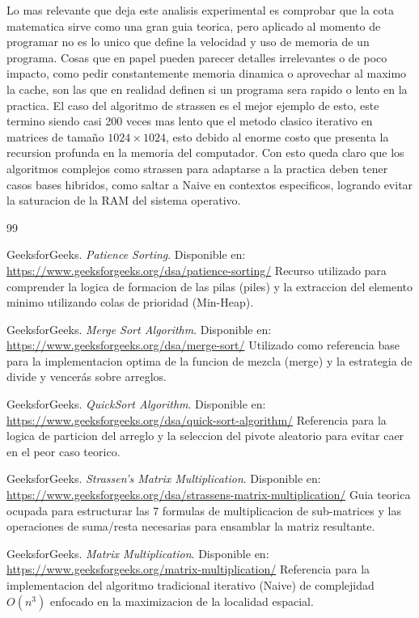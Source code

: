 Lo mas relevante que deja este analisis experimental es comprobar que la cota matematica sirve como una gran guia teorica, pero aplicado al momento de programar no es lo unico que define la velocidad y uso de memoria de un programa. Cosas que en papel pueden parecer detalles irrelevantes o de poco impacto, como pedir constantemente memoria dinamica o aprovechar al maximo la cache, son las que en realidad definen si un programa sera rapido o lento en la practica. El caso del algoritmo de strassen es el mejor ejemplo de esto, este termino siendo casi 200 veces mas lento que el metodo clasico iterativo en matrices de tamaño $1024 \times 1024$, esto debido al enorme costo que presenta la recursion profunda en la memoria del computador. Con esto queda claro que los algoritmos complejos como strassen para adaptarse a la practica deben tener casos bases hibridos, como saltar a Naive en contextos especificos, logrando evitar la saturacion de la RAM del sistema operativo.

\vspace{1cm}

\begin{thebibliography}{99}

GeeksforGeeks. \textit{Patience Sorting}. Disponible en: \url{https://www.geeksforgeeks.org/dsa/patience-sorting/}
Recurso utilizado para comprender la logica de formacion de las pilas (piles) y la extraccion del elemento minimo utilizando colas de prioridad (Min-Heap).

GeeksforGeeks. \textit{Merge Sort Algorithm}. Disponible en: \url{https://www.geeksforgeeks.org/dsa/merge-sort/}
Utilizado como referencia base para la implementacion optima de la funcion de mezcla (merge) y la estrategia de divide y vencerás sobre arreglos.

GeeksforGeeks. \textit{QuickSort Algorithm}. Disponible en: \url{https://www.geeksforgeeks.org/dsa/quick-sort-algorithm/}
Referencia para la logica de particion del arreglo y la seleccion del pivote aleatorio para evitar caer en el peor caso teorico.

GeeksforGeeks. \textit{Strassen's Matrix Multiplication}. Disponible en: \url{https://www.geeksforgeeks.org/dsa/strassens-matrix-multiplication/}
Guia teorica ocupada para estructurar las 7 formulas de multiplicacion de sub-matrices y las operaciones de suma/resta necesarias para ensamblar la matriz resultante.

GeeksforGeeks. \textit{Matrix Multiplication}. Disponible en: \url{https://www.geeksforgeeks.org/matrix-multiplication/}
Referencia para la implementacion del algoritmo tradicional iterativo (Naive) de complejidad $O(n^3)$ enfocado en la maximizacion de la localidad espacial.

\end{thebibliography}